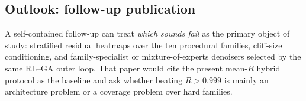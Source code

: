 \subsection{Outlook: follow-up publication}
\label{sec:outlook}

A self-contained follow-up can treat \emph{which sounds fail} as the primary object of study: stratified residual heatmaps over the ten procedural families, cliff-size conditioning, and family-specialist or mixture-of-experts denoisers selected by the same RL--GA outer loop.
That paper would cite the present mean-$R$ hybrid protocol as the baseline and ask whether beating $R>0.999$ is mainly an architecture problem or a coverage problem over hard families.
